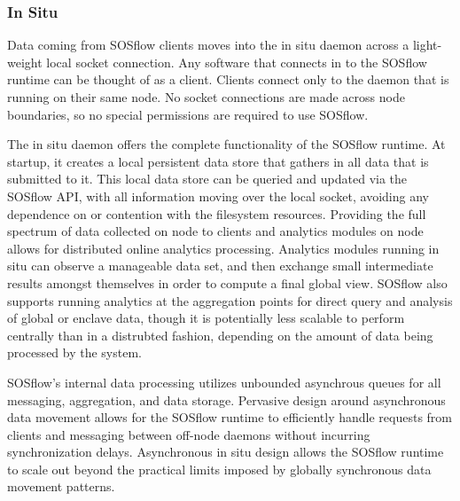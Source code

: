 \subsubsection{In Situ} %
%
Data coming from SOSflow clients moves into the in situ daemon across a
light-weight local socket connection.
%
Any software that connects in to the SOSflow runtime can be thought of as a
client.
%
Clients connect only to the daemon that is running on their same node.
%
No socket connections are made across node boundaries, so no special
permissions are required to use SOSflow.
%
%
\par
The in situ daemon offers the complete functionality of the SOSflow runtime.
%
At startup, it creates a local persistent data store that gathers in all
data that is submitted to it.
%
This local data store can be queried and updated via the SOSflow API, with
all information moving over the local socket, avoiding any dependence on
or contention with the filesystem resources.
%
Providing the full spectrum of data collected on node to clients and
analytics modules on node allows for distributed online analytics
processing.
%
Analytics modules running in situ can observe a manageable data set, and then
exchange small intermediate results amongst themselves in order to compute
a final global view.
%
SOSflow also supports running analytics at the aggregation points for direct
query and analysis of global or enclave data, though it is potentially
less scalable to perform centrally than in a distrubted fashion, depending
on the amount of data being processed by the system.
%
%
\par
%
SOSflow's internal data processing utilizes unbounded asynchrous queues
for all messaging, aggregation, and data storage.
%
Pervasive design around asynchronous data movement allows for the SOSflow
runtime to efficiently handle requests from clients and messaging between
off-node daemons without incurring synchronization delays.
%
Asynchronous in situ design allows the SOSflow runtime to scale out
beyond the practical limits imposed by globally synchronous data movement
patterns.
%
